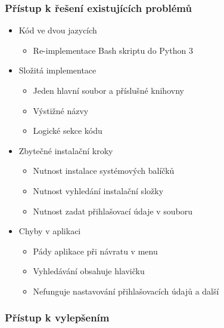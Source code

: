 \documentclass[%
  12pt,       				%
	t,                  %
	aspectratio=1610,   %
	unicode,						%
]{beamer}				    	%
\begin{document}
\begin{frame} 
\frametitle{Přístup k řešení existujících problémů}
\begin{itemize}
	\item Kód ve dvou jazycích
		\begin{itemize}
			\item Re-implementace Bash skriptu do Python 3
		\end{itemize}
	\item Složitá implementace
		\begin{itemize}
			\item Jeden hlavní soubor a příslušné knihovny
			\item Výstižné názvy
			\item Logické sekce kódu
		\end{itemize}
	\item Zbytečné instalační kroky
		\begin{itemize}
			\item Nutnost instalace systémových balíčků
			\item Nutnost vyhledání instalační složky
			\item Nutnost zadat přihlašovací údaje v souboru
		\end{itemize}
	\item Chyby v aplikaci
		\begin{itemize}
			\item Pády aplikace při návratu v menu
			\item Vyhledávání obsahuje hlavičku
			\item Nefunguje nastavování přihlašovacích údajů a další
		\end{itemize}
\end{itemize}
\end{frame} 

\begin{frame} 
\frametitle{Přístup k vylepšením}
	\begin{figure}[H]
		\centering
	\end{figure}
\end{frame}
\end{document}
